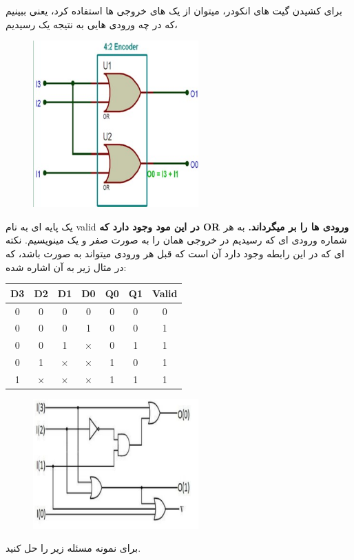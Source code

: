 \documentclass[20pt, a4paper]{article}
\begin{document}
برای کشیدن گیت های انکودر، میتوان از یک های خروجی ها استفاده کرد، 
یعنی ببینیم که در چه ورودی هایی به نتیجه یک رسیدیم، 

\begin{figure}[htbp]\centering
	\centerline{\includegraphics[width=180pt]{img/lastest/encoderOrGate.jpg}}
\end{figure}
\newpage

یک پایه ای به نام 
valid
\textbf{در این مود وجود دارد که 
OR
ورودی ها را بر میگرداند.}
به هر شماره ورودی ای که رسیدیم در خروجی همان را به صورت صفر و یک مینویسیم.
نکته ای که در این رابطه وجود دارد آن است که قبل هر ورودی میتواند به صورت 
باشد، که در مثال زیر به آن اشاره شده:

\begin{LTR}
	\begin{tabular}{ c c c c | c | c | c }
		D3 & D2 & D1 & D0 & Q0 & Q1 & Valid\\
		\hline
		0 & 0 & 0 & 0 & 0 & 0 & 0\\
		0 & 0 & 0 & 1 & 0 & 0 & 1\\
		0 & 0 & 1 & × & 0 & 1 & 1\\
		0 & 1 & × & × & 1 & 0 & 1\\
		1 & × & × & × & 1 & 1 & 1
	\end{tabular}
\end{LTR}
\hfill \break

\begin{figure}[htbp]\centering
	\centerline{\includegraphics[width=180pt]{img/lastest/encoder1.jpg}}
\end{figure}
\newpage
برای نمونه مسئله زیر را حل کنید.
\end{document}
